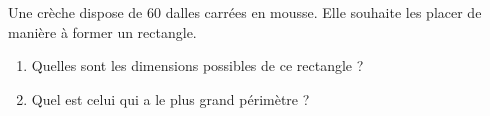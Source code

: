 \begin{exo}{}
	Une crèche dispose de $60$ dalles carrées en mousse. Elle souhaite les placer de manière à former un rectangle.
	\begin{enumerate}
		\item Quelles sont les dimensions possibles de ce rectangle ?
		\item Quel est celui qui a le plus grand périmètre ?
	\end{enumerate}
\end{exo}
